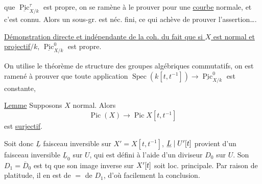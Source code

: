 que $\underline{\operatorname{Pic}}^\tau_{X/k}$ est propre, on se ramène à le prouver pour une \uline{courbe} normale, et c'est connu. Alors un sous-gr.  est néc. fini, ce qui achève de prouver l'assertion\ldots.


\uline{Démonstration directe et indépendante de la coh. du fait que si $X$ est  normal et projectif$/k$},  $\underline{\operatorname{Pic}}^0_{X/k}$ est propre.

On utilise le théorème de structure des groupes algébriques commutatifs, on est ramené à prouver que toute application $\operatorname{Spec}(k[t,t^{-1}])\longrightarrow\underline{\operatorname{Pic}}^0_{X/k}$ est constante, 


\uline{Lemme} Supposons $X$   normal. Alors 
\[
 \operatorname{Pic}(X)\longrightarrow\operatorname{Pic}X[t,t^{-1}]
\]
est  \uline{surjectif}.


 Soit donc $\underline L$ faisceau inversible sur $X'=X[t,t^{-1}]$,   $\underline L\mid U'[t]$ provient d'un faisceau inversible $\underline L_0$ sur $U$, qui est défini à l'aide d'un diviseur $D_0$ sur $U$. Son  $D_1=\overline{D}_0$ est tq que son image inverse sur $X'[t]$  soit loc. principale. Par raison de platitude, il en est de $=$ de $D_1$, d'où facilement la conclusion.
